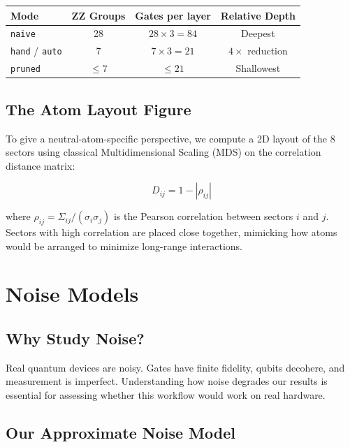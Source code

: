 \documentclass[12pt, a4paper]{article}
\begin{document}
\begin{center}
\begin{tabular}{lccc}
\toprule
\textbf{Mode} & \textbf{ZZ Groups} & \textbf{Gates per layer} & \textbf{Relative Depth} \\
\midrule
\texttt{naive} & 28 & $28 \times 3 = 84$ & Deepest \\
\texttt{hand} / \texttt{auto} & 7 & $7 \times 3 = 21$ & $4\times$ reduction \\
\texttt{pruned} & $\leq 7$ & $\leq 21$ & Shallowest \\
\bottomrule
\end{tabular}
\end{center}

\subsection{The Atom Layout Figure}

To give a neutral-atom-specific perspective, we compute a 2D layout of the 8
sectors using classical Multidimensional Scaling (MDS) on the correlation
distance matrix:

\[
D_{ij} = 1 - |\rho_{ij}|
\]

where $\rho_{ij} = \Sigma_{ij} / (\sigma_i \sigma_j)$ is the Pearson
correlation between sectors $i$ and $j$. Sectors with high correlation are
placed close together, mimicking how atoms would be arranged to minimize
long-range interactions.


\section{Noise Models}

\subsection{Why Study Noise?}

Real quantum devices are noisy. Gates have finite fidelity, qubits decohere,
and measurement is imperfect. Understanding how noise degrades our results is
essential for assessing whether this workflow would work on real hardware.

\subsection{Our Approximate Noise Model}
\end{document}

